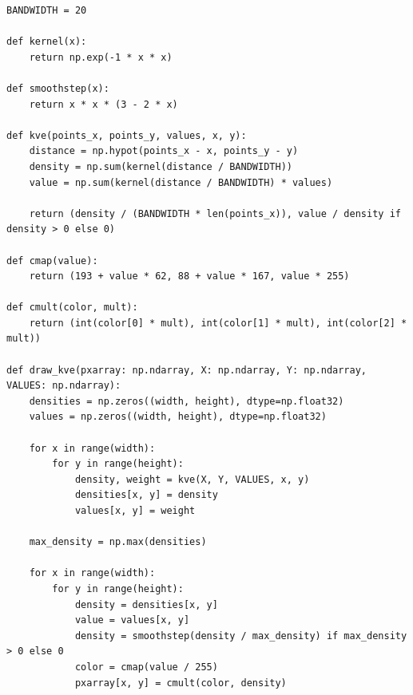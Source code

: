 \begin{lstlisting}[language={[AS]Python},caption=Reference implementation in Python]
BANDWIDTH = 20

def kernel(x):
    return np.exp(-1 * x * x)

def smoothstep(x):
    return x * x * (3 - 2 * x)

def kve(points_x, points_y, values, x, y):
    distance = np.hypot(points_x - x, points_y - y)
    density = np.sum(kernel(distance / BANDWIDTH))
    value = np.sum(kernel(distance / BANDWIDTH) * values)

    return (density / (BANDWIDTH * len(points_x)), value / density if density > 0 else 0)

def cmap(value):
    return (193 + value * 62, 88 + value * 167, value * 255)

def cmult(color, mult):
    return (int(color[0] * mult), int(color[1] * mult), int(color[2] * mult))

def draw_kve(pxarray: np.ndarray, X: np.ndarray, Y: np.ndarray, VALUES: np.ndarray):
    densities = np.zeros((width, height), dtype=np.float32)
    values = np.zeros((width, height), dtype=np.float32)

    for x in range(width):
        for y in range(height):
            density, weight = kve(X, Y, VALUES, x, y)
            densities[x, y] = density
            values[x, y] = weight

    max_density = np.max(densities)

    for x in range(width):
        for y in range(height):
            density = densities[x, y]
            value = values[x, y]
            density = smoothstep(density / max_density) if max_density > 0 else 0
            color = cmap(value / 255)
            pxarray[x, y] = cmult(color, density)
\end{lstlisting}
